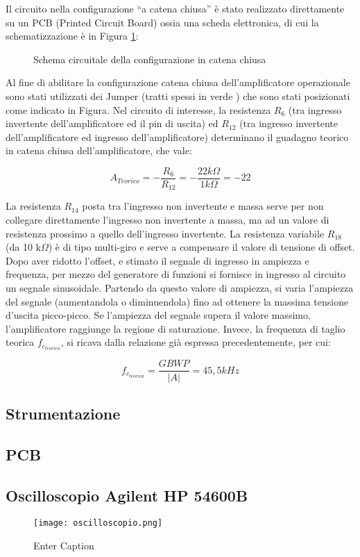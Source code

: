 Il circuito nella configurazione “a catena chiusa” è stato realizzato direttamente su un PCB (Printed Circuit Board) ossia una scheda elettronica, di cui la schematizzazione è in Figura \ref{fig:schemaCatenaChiusa}:
\begin{figure}
    \centering
    \caption{Schema circuitale della configurazione in catena chiusa}
    \label{fig:schemaCatenaChiusa}
\end{figure}
Al fine di abilitare la configurazione catena chiusa dell'amplificatore operazionale sono stati utilizzati dei Jumper (tratti spessi in verde ) che sono stati posizionati come indicato in Figura.
\FloatBarrier
Nel circuito di interesse, la resistenza \(R_6\) (tra ingresso invertente dell’amplificatore ed il pin di uscita) ed \(R_{12}\) (tra ingresso invertente dell’amplificatore ed ingresso dell’amplificatore) determinano il guadagno teorico in catena chiusa dell’amplificatore, che vale:

\[A_{Teorico}=-\frac{R_6}{R_{12}}=-\frac{22 k\Omega}{1 k\Omega}=-22\]

La resistenza \(R_{14}\) posta tra l’ingresso non invertente e massa serve per non collegare direttamente l’ingresso non invertente a massa, ma ad un valore di resistenza prossimo a quello dell’ingresso invertente. La resistenza variabile \(R_{18}\) (da 10 k\(\Omega\)) è di tipo multi-giro e serve a compensare il valore di tensione di offset. Dopo aver ridotto l’offset, e stimato il segnale di ingresso in ampiezza e frequenza, per mezzo del generatore di funzioni si fornisce in ingresso al circuito un segnale sinusoidale. Partendo da questo valore di ampiezza, si varia l’ampiezza del segnale (aumentandola o diminuendola) fino ad ottenere la massima tensione d’uscita picco-picco. Se l’ampiezza del segnale supera il valore massimo, l’amplificatore raggiunge la regione di saturazione.
Invece, la frequenza di taglio teorica \(f_{c_{teorica}}\), si ricava dalla relazione già espressa precedentemente, per cui:

\[f_{c_{teorica}}=\frac{GBWP}{|A|}=45,5kHz\]
\subsection{\textbf{Strumentazione}}
\subsection{\textbf{PCB}}

\subsection{\textbf{Oscilloscopio Agilent HP 54600B}}
\begin{figure}
    \centering
    \texttt{[image: oscilloscopio.png]}
    \caption{Enter Caption}
    \label{fig:enter-label}
\end{figure}
